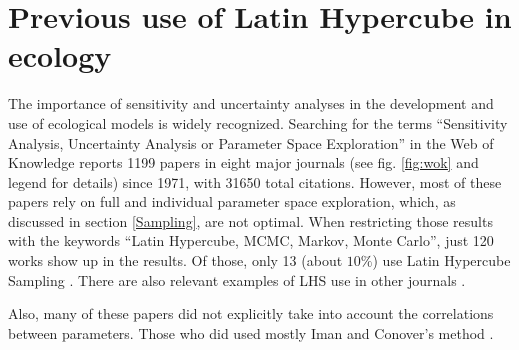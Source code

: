\section{Previous use of Latin Hypercube in ecology}\label{Studies}
The importance of sensitivity and uncertainty analyses in the development 
and use of ecological models is widely recognized. Searching for the terms
``Sensitivity Analysis, Uncertainty Analysis or Parameter Space
Exploration'' in the Web of Knowledge reports 1199 papers in eight major
journals (see fig. \ref{fig:wok} and legend for details) since 1971, 
with 31650 total
citations. However,
most of these papers rely on full and individual parameter space
exploration, which, as discussed in section \ref{Sampling}, are not
optimal. When restricting those results with the keywords ``Latin Hypercube,
MCMC, Markov, Monte Carlo'', just 120 works show up in the results. Of 
those, only 13 (about $10\%$) use Latin Hypercube Sampling 
\citep{Berthaume12, Confalonieri10, Meyer07, Tiemeyer07, Xu05,
Moore04, Shirley03, Duchesne03, Reed84, Marino08, Nathan01, Hamilton10,
Lovvorn96}. There are also relevant examples of LHS use in other
journals \citep{Estill12, Fisher10, Thebault10}.

Also, many of these papers did not explicitly take into account the
correlations between parameters. Those who did used mostly Iman and 
Conover's method \citep{ImanConover82}. 

